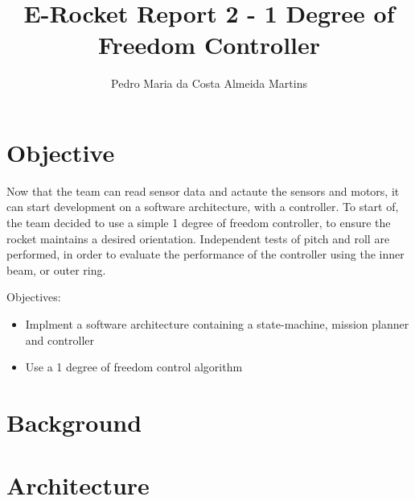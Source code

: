 \documentclass[a4paper]{article}
\begin{document}
\title{E-Rocket Report 2 - 1 Degree of Freedom Controller}
\author{Pedro Maria da Costa Almeida Martins}

\maketitle
\thispagestyle{empty}
\clearpage


\tableofcontents
\thispagestyle{empty}
\clearpage



\section{Objective}

Now that the team can read sensor data and actaute the sensors and motors, it can start development on a software architecture, with a controller. 
To start of, the team decided to use a simple 1 degree of freedom controller, to ensure the rocket maintains a desired orientation. 
Independent tests of pitch and roll are performed, in order to evaluate the performance of the controller using the inner beam, or outer ring. 


Objectives: 

\begin{itemize}
    \item Implment a software architecture containing a state-machine, mission planner and controller 
    \item Use a 1 degree of freedom control algorithm 
\end{itemize}


\clearpage
\label{sec::background}
\section{Background}



\clearpage
\section{Architecture}

   
\end{document}
